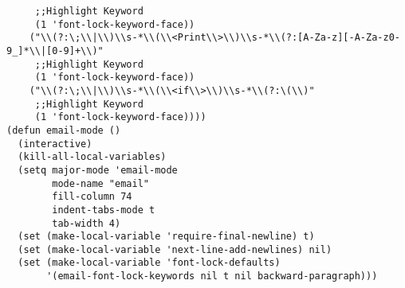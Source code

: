 \documentclass[]{article}
\begin{document}
\begin{lstlisting}
     ;;Highlight Keyword
     (1 'font-lock-keyword-face))
    ("\\(?:\;\\|\\)\\s-*\\(\\<Print\\>\\)\\s-*\\(?:[A-Za-z][-A-Za-z0-9_]*\\|[0-9]+\\)"
     ;;Highlight Keyword
     (1 'font-lock-keyword-face))
    ("\\(?:\;\\|\\)\\s-*\\(\\<if\\>\\)\\s-*\\(?:\(\\)"
     ;;Highlight Keyword
     (1 'font-lock-keyword-face))))
(defun email-mode ()
  (interactive)
  (kill-all-local-variables)
  (setq major-mode 'email-mode
        mode-name "email"
        fill-column 74
        indent-tabs-mode t
        tab-width 4)
  (set (make-local-variable 'require-final-newline) t)
  (set (make-local-variable 'next-line-add-newlines) nil)
  (set (make-local-variable 'font-lock-defaults)
       '(email-font-lock-keywords nil t nil backward-paragraph)))


  \end{lstlisting}
\end{document}
